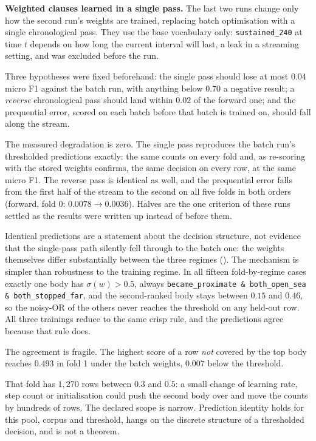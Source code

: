 \textbf{Weighted clauses learned in a single pass.} The last two runs change only how the second run's weights are trained, replacing batch optimisation with a single chronological pass. They use the base vocabulary only: \texttt{sustained\_240} at time $t$ depends on how long the current interval will last, a leak in a streaming setting, and was excluded before the run.

Three hypotheses were fixed beforehand: the single pass should lose at most $0.04$ micro F1 against the batch run, with anything below $0.70$ a negative result; a \emph{reverse} chronological pass should land within $0.02$ of the forward one; and the prequential error, scored on each batch before that batch is trained on, should fall along the stream.

The measured degradation is zero. The single pass reproduces the batch run's thresholded predictions exactly: the same counts on every fold and, as re-scoring with the stored weights confirms, the same decision on every row, at the same micro F1. The reverse pass is identical as well, and the prequential error falls from the first half of the stream to the second on all five folds in both orders (forward, fold 0: $0.0078\to0.0036$). Halves are the one criterion of these runs settled as the results were written up instead of before them.

Identical predictions are a statement about the decision structure, not evidence that the single-pass path silently fell through to the batch one: the weights themselves differ substantially between the three regimes (). The mechanism is simpler than robustness to the training regime. In all fifteen fold-by-regime cases exactly one body has $\sigma(w)>0.5$, always \texttt{became\_proximate \&\allowbreak\ both\_open\_sea \&\allowbreak\ both\_stopped\_far}, and the second-ranked body stays between $0.15$ and $0.46$, so the noisy-OR of the others never reaches the threshold on any held-out row. All three trainings reduce to the same crisp rule, and the predictions agree because that rule does.

The agreement is fragile. The highest score of a row \emph{not} covered by the top body reaches $0.493$ in fold 1 under the batch weights, $0.007$ below the threshold.

That fold has $1{,}270$ rows between $0.3$ and $0.5$: a small change of learning rate, step count or initialisation could push the second body over and move the counts by hundreds of rows. The declared scope is narrow. Prediction identity holds for this pool, corpus and threshold, hangs on the discrete structure of a thresholded decision, and is not a theorem.

